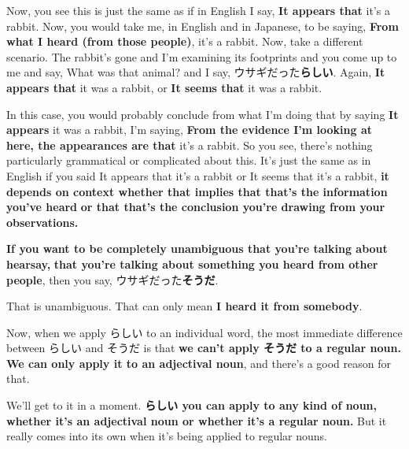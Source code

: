 \thinrule

Now, you see this is just the same as if in English I say, {\bf It appears that} it's a rabbit. Now, you would take me, in English and in Japanese, to be saying, {\bf From what I heard (from those people)}, it's a rabbit. Now, take a different scenario. The rabbit's gone and I'm examining its footprints and you come up to me and say, What was that animal? and I say, ウサギだった{\bf らしい}. Again, {\bf It appears that} it was a rabbit, or {\bf It seems that} it was a rabbit.

{}

In this case, you would probably conclude from what I'm doing that by saying {\bf It appears} it was a rabbit, I'm saying, {\bf From the evidence I'm looking at here, the appearances are that} it's a rabbit. So you see, there's nothing particularly grammatical or complicated about this. It's just the same as in English if you said It appears that it's a rabbit or It seems that it's a rabbit, {\bf it depends on context whether that implies that that's the information you've heard} {\bf or that that's the conclusion you're drawing from your observations.}

\thinrule

{\bf If you want to be completely unambiguous that you're talking about hearsay,} {\bf that you're talking about something you heard from other people}, then you say, ウサギだった{\bf そうだ}.

{}

That is unambiguous. That can only mean {\bf I heard it from somebody}.

\stopsectionlevel

\startsectionlevel[title={らしい vs そうだ - an individual word},reference={らしい-vs-そうだ---an-individual-word}]

Now, when we apply らしい to an individual word, the most immediate difference between らしい and そうだ is that {\bf we can't apply そうだ to a regular noun.} {\bf We can only apply it to an adjectival noun}, and there's a good reason for that.

{}

We'll get to it in a moment. {\bf らしい you can apply to any kind of noun,} {\bf whether it's an adjectival noun or whether it's a regular noun.} But it really comes into its own when it's being applied to regular nouns.

\thinrule

